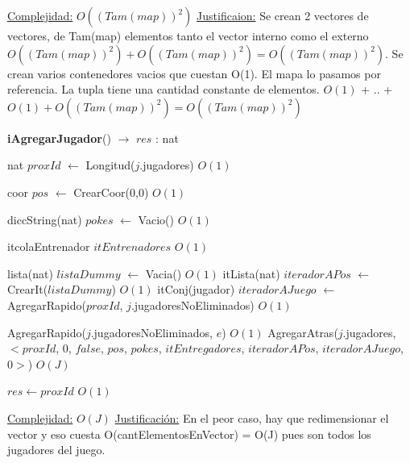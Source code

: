 \begin{Algoritmos}
\begin{algorithm}[H]
\begin{algorithmic}[1]
\medskip
\Statex \underline{Complejidad:} $O((Tam(map))^2)$
\Statex \underline{Justificaion:} Se crean 2 vectores de vectores, de Tam(map) elementos tanto el vector interno como el externo $O((Tam(map))^2) + O((Tam(map))^2) = O((Tam(map))^2)$. Se crean varios contenedores vacios que cuestan O(1). El mapa lo pasamos por referencia. La tupla tiene una cantidad constante de elementos. $O(1)$ + .. + $O(1) + O((Tam(map))^2) = O((Tam(map))^2)$

\end{algorithmic}
\end{algorithm}


\begin{algorithm}[H]
{\textbf{iAgregarJugador}() $\to$ $res$ : nat}
\begin{algorithmic}[1]

\State nat $proxId$ $\gets$ Longitud($j$.jugadores)   \Comment $O(1)$


\State coor $pos$ $\gets$ CrearCoor(0,0) \Comment $O(1)$

\State diccString(nat) $pokes$ $\gets$ Vacio() \Comment $O(1)$
 
\State itcolaEntrenador $itEntrenadores$  \Comment $O(1)$

\State lista(nat) $listaDummy$ $\gets$ Vacia() \Comment $O(1)$
\State itLista(nat) $iteradorAPos$ $\gets$ CrearIt($listaDummy$) \Comment $O(1)$
\State itConj(jugador) $iteradorAJuego$ $\gets$ AgregarRapido($proxId$, $j$.jugadoresNoEliminados) \Comment $O(1)$

\State AgregarRapido($j$.jugadoresNoEliminados, $e$) \Comment $O(1)$
\State AgregarAtras($j$.jugadores, $<proxId$, 0, $false$, $pos$, $pokes$, $itEntregadores$, $iteradorAPos$, $iteradorAJuego$, $0>$) \Comment $O(J)$

\State $res \gets proxId$ \Comment $O(1)$

\medskip
\State \underline{Complejidad:} $O(J)$
\State \underline{Justificaci\'on:} En el peor caso, hay que redimensionar el vector y eso cuesta O(cantElementosEnVector) = O(J) pues son todos los jugadores del juego.


\end{algorithmic}
\end{algorithm}
\end{Algoritmos}

